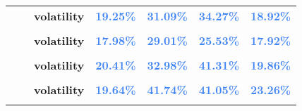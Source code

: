 \documentclass[
  authoryear,
  preprint,
  3p]{elsarticle}
\begin{document}
\begin{longtable}[t]{>{}l>{}l>{}l>{}r>{}r>{}r>{}r}
\textbf{} & \textbf{} & \textbf{volatility} & \textcolor[HTML]{4285f4}{\textbf{19.25\%}} & \textcolor[HTML]{4285f4}{\textbf{31.09\%}} & \textcolor[HTML]{4285f4}{\textbf{34.27\%}} & \textcolor[HTML]{4285f4}{\textbf{18.92\%}}\\
\textbf{\cellcolor{gray!10}{}} & \textbf{\cellcolor{gray!10}{backwardation}} & \textbf{\cellcolor{gray!10}{mean}} & \textcolor[HTML]{4285f4}{\textbf{\cellcolor{gray!10}{1.54\%}}} & \textcolor[HTML]{4285f4}{\textbf{\cellcolor{gray!10}{25.22\%}}} & \textcolor[HTML]{4285f4}{\textbf{\cellcolor{gray!10}{18.66\%}}} & \textcolor[HTML]{4285f4}{\textbf{\cellcolor{gray!10}{11.99\%}}}\\
\textbf{} & \textbf{} & \textbf{volatility} & \textcolor[HTML]{4285f4}{\textbf{17.98\%}} & \textcolor[HTML]{4285f4}{\textbf{29.01\%}} & \textcolor[HTML]{4285f4}{\textbf{25.53\%}} & \textcolor[HTML]{4285f4}{\textbf{17.92\%}}\\
\textbf{\cellcolor{gray!10}{}} & \textbf{\cellcolor{gray!10}{contango}} & \textbf{\cellcolor{gray!10}{mean}} & \textcolor[HTML]{4285f4}{\textbf{\cellcolor{gray!10}{-0.95\%}}} & \textcolor[HTML]{4285f4}{\textbf{\cellcolor{gray!10}{32\%}}} & \textcolor[HTML]{4285f4}{\textbf{\cellcolor{gray!10}{-6.78\%}}} & \textcolor[HTML]{4285f4}{\textbf{\cellcolor{gray!10}{-11.89\%}}}\\
\addlinespace
\textbf{} & \textbf{} & \textbf{volatility} & \textcolor[HTML]{4285f4}{\textbf{20.41\%}} & \textcolor[HTML]{4285f4}{\textbf{32.98\%}} & \textcolor[HTML]{4285f4}{\textbf{41.31\%}} & \textcolor[HTML]{4285f4}{\textbf{19.86\%}}\\
\textbf{\cellcolor{gray!10}{Lead (XLME)}} & \textbf{\cellcolor{gray!10}{whole period}} & \textbf{\cellcolor{gray!10}{mean}} & \textcolor[HTML]{4285f4}{\textbf{\cellcolor{gray!10}{3.83\%}}} & \textcolor[HTML]{4285f4}{\textbf{\cellcolor{gray!10}{28.99\%}}} & \textcolor[HTML]{4285f4}{\textbf{\cellcolor{gray!10}{10.74\%}}} & \textcolor[HTML]{4285f4}{\textbf{\cellcolor{gray!10}{2.07\%}}}\\
\textbf{} & \textbf{} & \textbf{volatility} & \textcolor[HTML]{4285f4}{\textbf{19.64\%}} & \textcolor[HTML]{4285f4}{\textbf{41.74\%}} & \textcolor[HTML]{4285f4}{\textbf{41.05\%}} & \textcolor[HTML]{4285f4}{\textbf{23.26\%}}\\
\textbf{\cellcolor{gray!10}{}} & \textbf{\cellcolor{gray!10}{backwardation}} & \textbf{\cellcolor{gray!10}{mean}} & \textcolor[HTML]{4285f4}{\textbf{\cellcolor{gray!10}{7.59\%}}} & \textcolor[HTML]{4285f4}{\textbf{\cellcolor{gray!10}{11.21\%}}} & \textcolor[HTML]{4285f4}{\textbf{\cellcolor{gray!10}{9.87\%}}} & \textcolor[HTML]{4285f4}{\textbf{\cellcolor{gray!10}{17.05\%}}}\\

\end{longtable}
\end{document}
